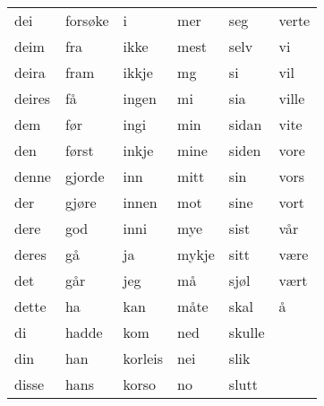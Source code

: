 \begin{table}[htbp]
\begin{tabular}{l l l l l l}
    dei & forsøke & i & mer & seg & verte \\
    deim & fra & ikke & mest & selv & vi \\
    deira & fram & ikkje & mg & si & vil \\
    deires & få & ingen & mi & sia & ville \\
    dem & før & ingi & min & sidan & vite \\
    den & først & inkje & mine & siden & vore \\
    denne & gjorde & inn & mitt & sin & vors \\
    der & gjøre & innen & mot & sine & vort \\
    dere & god & inni & mye & sist & vår \\
    deres & gå & ja & mykje & sitt & være \\
    det & går & jeg & må & sjøl & vært \\
    dette & ha & kan & måte & skal & å \\
    di & hadde & kom & ned & skulle &  \\
    din & han & korleis & nei & slik &  \\
    disse & hans & korso & no & slutt &  \\
    \bottomrule
\end{tabular}
\end{table}